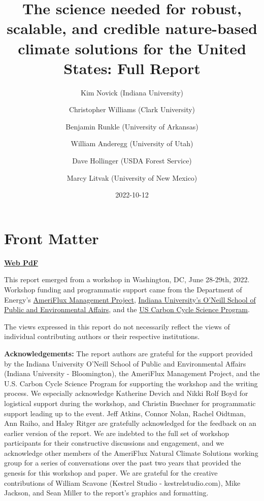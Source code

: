 \documentclass[
  letterpaper,
  DIV=11,
  numbers=noendperiod]{scrreprt}
\title{The science needed for robust, scalable, and credible
nature-based climate solutions for the United States: Full Report}
\author{Kim Novick (Indiana University) \and Christopher Williams (Clark
University) \and Benjamin Runkle (University of Arkansas) \and William
Anderegg (University of Utah) \and Dave Hollinger (USDA Forest
Service) \and Marcy Litvak (University of New Mexico)}
\date{2022-10-12}
\renewcommand*\contentsname{Table of contents}
\newcommand\contentsname{Table of contents}
\begin{document}
\maketitle
\ifdefined\Shaded\renewenvironment{Shaded}{\begin{tcolorbox}[interior hidden, borderline west={3pt}{0pt}{shadecolor}, enhanced, breakable, boxrule=0pt, sharp corners, frame hidden]}{\end{tcolorbox}}\fi

\renewcommand*\contentsname{Table of contents}
{
\hypersetup{linkcolor=}
\setcounter{tocdepth}{2}
\tableofcontents
}

\hypertarget{front-matter}{%
\chapter*{Front Matter}\label{front-matter}}


\textbf{\href{https://scholarworks.iu.edu/dspace/bitstream/handle/2022/28264/FullReport_20221011_uncoupled.pdf}{Web
PdF}}

This report emerged from a workshop in Washington, DC, June 28-29th,
2022. Workshop funding and programmatic support came from the Department
of Energy's
\href{https://ameriflux.lbl.gov/about/ameriflux-management-project/}{AmeriFlux
Management Project}, \href{https://oneill.indiana.edu/}{Indiana
University's O'Neill School of Public and Environmental Affairs}, and
the \href{https://www.carboncyclescience.us/}{US Carbon Cycle Science
Program}.

The views expressed in this report do not necessarily reflect the views
of individual contributing authors or their respective institutions.

\textbf{Acknowledgements:} The report authors are grateful for the
support provided by the Indiana University O'Neill School of Public and
Environmental Affairs (Indiana University - Bloomington), the AmeriFlux
Management Project, and the U.S. Carbon Cycle Science Program for
supporting the workshop and the writing process. We especially
acknowledge Katherine Devich and Nikki Rolf Boyd for logistical support
during the workshop, and Christin Buechner for programmatic support
leading up to the event. Jeff Atkins, Connor Nolan, Rachel Oidtman, Ann
Raiho, and Haley Ritger are gratefully acknowledged for the feedback on
an earlier version of the report. We are indebted to the full set of
workshop participants for their constructive discussions and engagement,
and we acknowledge other members of the AmeriFlux Natural Climate
Solutions working group for a series of conversations over the past two
years that provided the genesis for this workshop and paper. We are
grateful for the creative contributions of William Scavone (Kestrel
Studio - kestrelstudio.com), Mike Jackson, and Sean Miller to the
report's graphics and formatting.
\end{document}
